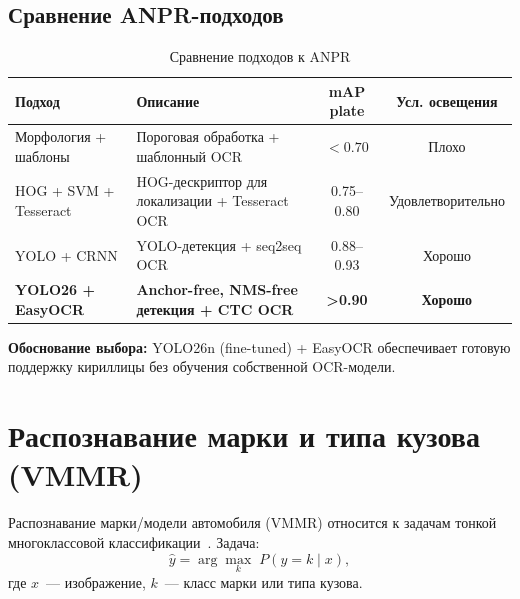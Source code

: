 \documentclass[10pt,a4paper]{report}
\numberwithin{equation}{chapter}
\numberwithin{figure}{chapter}
\numberwithin{table}{chapter}
\begin{document}
\subsection{Сравнение ANPR-подходов}

\begin{table}[H]
\centering
\caption{Сравнение подходов к ANPR}
\label{tab:anpr}
\begin{tabularx}{\textwidth}{lXcc}
\toprule
\textbf{Подход} & \textbf{Описание} & \textbf{mAP plate} & \textbf{Усл. освещения} \\
\midrule
Морфология + шаблоны & Пороговая обработка + шаблонный OCR & $<0.70$ & Плохо \\
HOG + SVM + Tesseract & HOG-дескриптор для локализации + Tesseract OCR & 0.75--0.80 & Удовлетворительно \\
YOLO + CRNN & YOLO-детекция + seq2seq OCR & 0.88--0.93 & Хорошо \\
\textbf{YOLO26 + EasyOCR} & \textbf{Anchor-free, NMS-free детекция + CTC OCR} & \textbf{>0.90} & \textbf{Хорошо} \\
\bottomrule
\end{tabularx}
\end{table}

\noindent\textbf{Обоснование выбора:} YOLO26n (fine-tuned) + EasyOCR обеспечивает
готовую поддержку кириллицы без обучения собственной OCR-модели.

\section{Распознавание марки и типа кузова (VMMR)}

Распознавание марки/модели автомобиля (VMMR) относится к задачам тонкой
многоклассовой классификации~\cite{vmmr2024,siddiqui2016,manzoor2022}. Задача:
\begin{equation}
  \hat{y} = \arg\max_{k}\; P(y = k \mid x),
\end{equation}
где $x$~--- изображение, $k$~--- класс марки или типа кузова.
\end{document}
